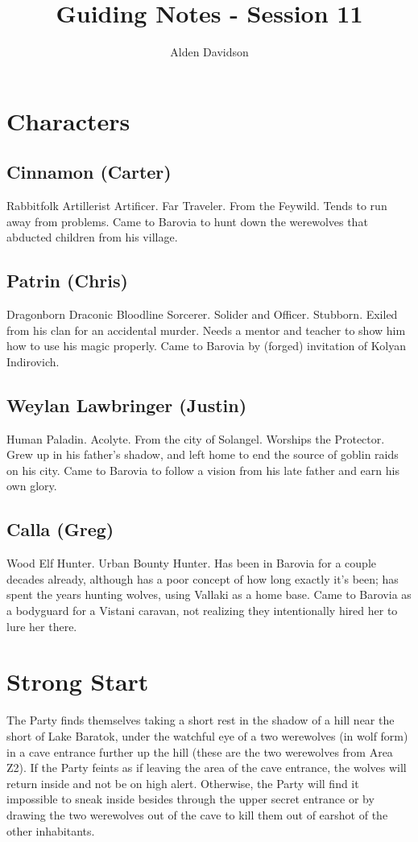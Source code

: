 \documentclass[a4paper,11pt]{article}
\title{Guiding Notes - Session 11}
\author{Alden Davidson}
\begin{document}
\maketitle
\tableofcontents

\pagebreak
\section{Characters}
\label{sec:Characters}
\subsection{Cinnamon (Carter)}
  Rabbitfolk Artillerist Artificer. Far Traveler. From the Feywild. Tends to run away from problems. Came to
  Barovia to hunt down the werewolves that abducted children from his village.
\subsection{Patrin (Chris)}
  Dragonborn Draconic Bloodline Sorcerer. Solider and Officer. Stubborn. Exiled from his clan for an accidental 
  murder. Needs a mentor and teacher to show him how to use his magic properly. Came to Barovia by (forged)
  invitation of Kolyan Indirovich.
\subsection{Weylan Lawbringer (Justin)}
  Human Paladin. Acolyte. From the city of Solangel. Worships the Protector. Grew up in his father's shadow, and 
  left home to end the source of goblin raids on his city. Came to Barovia to follow a vision from his late 
  father and earn his own glory.
\subsection{Calla (Greg)}
  Wood Elf Hunter. Urban Bounty Hunter. Has been in Barovia for a couple decades already, although has a poor 
  concept of how long exactly it's been; has spent the years hunting wolves, using Vallaki as a home base. Came to 
  Barovia as a bodyguard for a Vistani caravan, not realizing they intentionally hired her to lure her there.

\pagebreak
\section{Strong Start}
\label{sec:StrongStart}
The Party finds themselves taking a short rest in the shadow of a hill near the short of Lake Baratok, under the
watchful eye of a two werewolves (in wolf form) in a cave entrance further up the hill (these are the two 
werewolves from Area Z2). If the Party feints as if leaving the area of the cave entrance, the wolves will return 
inside and not be on high alert. Otherwise, the Party will find it impossible to sneak inside besides through the 
upper secret entrance or by drawing the two werewolves out of the cave to kill them out of earshot of the other
inhabitants.
\end{document}
